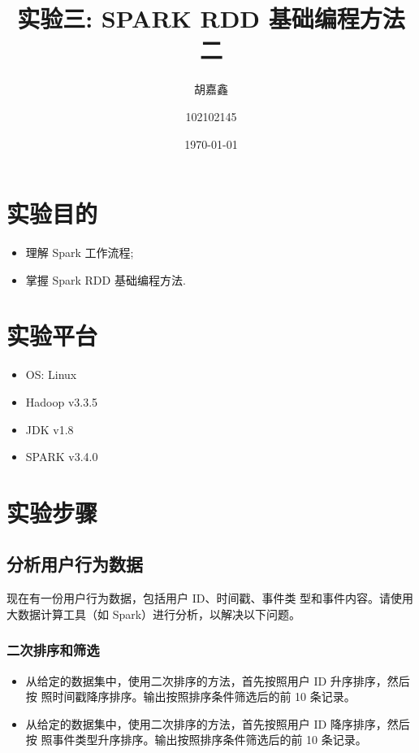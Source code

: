 \documentclass{article}
\title{实验三: SPARK RDD 基础编程方法二}
\author{胡嘉鑫 \and 102102145}
\date{\today}
\begin{document}
\maketitle
\tableofcontents

\section{实验目的}
\begin{itemize}
  \item 理解 Spark 工作流程;
  \item 掌握 Spark RDD 基础编程方法.
\end{itemize}

\section{实验平台}
\begin{itemize}
  \item OS: Linux
  \item Hadoop v3.3.5
  \item JDK v1.8
  \item SPARK v3.4.0
\end{itemize}

\section{实验步骤}

\subsection{分析用户行为数据}

现在有一份用户行为数据，包括用户 ID、时间戳、事件类
型和事件内容。请使用大数据计算工具（如 Spark）进行分析，以解决以下问题。

\subsubsection{二次排序和筛选}

\begin{itemize}
  \item 从给定的数据集中，使用二次排序的方法，首先按照用户 ID 升序排序，然后按
    照时间戳降序排序。输出按照排序条件筛选后的前 10 条记录。
  \item 从给定的数据集中，使用二次排序的方法，首先按照用户 ID 降序排序，然后按
    照事件类型升序排序。输出按照排序条件筛选后的前 10 条记录。
\end{itemize}
\end{document}
